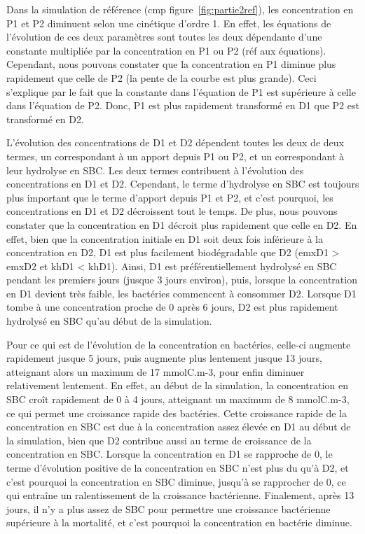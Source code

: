 \par{
Dans la simulation de référence (cmp figure~\ref{fig:partie2ref}),
les concentration en P1 et P2 diminuent selon une cin\'etique d'ordre 1. En effet, les \'equations de l'\'evolution de ces deux param\`etres sont toutes les deux d\'ependante d'une constante multipli\'ee par la concentration en P1 ou P2 (r\'ef aux \'equations). Cependant, nous pouvons constater que la concentration en P1 diminue plus rapidement que celle de P2 (la pente de la courbe est plus grande). Ceci s'explique par le fait que la constante dans l'\'equation de P1 est sup\'erieure \`a celle dans l'\'equation de P2. Donc, P1 est plus rapidement transform\'e en D1 que P2 est transform\'e en D2.
}
\par{
L'\'evolution des concentrations de D1 et D2 d\'ependent toutes les deux de deux termes, un correspondant \`a un apport depuis P1 ou P2, et un correspondant \`a leur hydrolyse en SBC. Les deux termes contribuent \`a l'\'evolution des concentrations en D1 et D2. Cependant, le terme d'hydrolyse en SBC est toujours plus important que le terme d'apport depuis P1 et P2, et c'est pourquoi, les concentrations en D1 et D2 d\'ecroissent tout le temps. De plus, nous pouvons constater que la concentration en D1 d\'ecroit plus rapidement que celle en D2. En effet, bien que la concentration initiale en D1 soit deux fois inf\'erieure \`a la concentration en D2, D1 est plus facilement biod\'egradable que D2 (emxD1 > emxD2 et khD1 < khD1). Ainsi, D1 est pr\'ef\'erentiellement hydrolys\'e en SBC pendant les premiers jours (jusque 3 jours environ), puis, lorsque la concentration en D1 devient tr\`es faible, les bact\'eries commencent \`a consommer D2. Lorsque D1 tombe \`a une concentration proche de 0 apr\`es 6 jours, D2 est plus rapidement hydrolys\'e en SBC qu'au d\'ebut de la simulation.
}
\par{
Pour ce qui est de l'\'evolution de la concentration en bact\'eries, celle-ci augmente rapidement jusque 5 jours, puis augmente plus lentement jusque 13 jours, atteignant alors un maximum de 17 mmolC.m-3, pour enfin diminuer relativement lentement. En effet, au d\'ebut de la simulation, la concentration en SBC cro\^it rapidement de 0 \`a 4 jours, atteignant un maximum de 8 mmolC.m-3, ce qui permet une croissance rapide des bact\'eries. Cette croissance rapide de la concentration en SBC est due \`a la concentration assez \'elev\'ee en D1 au d\'ebut de la simulation, bien que D2 contribue aussi au terme de croissance de la concentration en SBC. Lorsque la concentration en D1 se rapproche de 0, le terme d'\'evolution positive de la concentration en SBC n'est plus du qu'\`a D2, et c'est pourquoi la concentration en SBC diminue, jusqu'\`a se rapprocher de 0, ce qui entra\^ine un ralentissement de la croissance bact\'erienne. Finalement, apr\`es 13 jours, il n'y a plus assez de SBC pour permettre une croissance bact\'erienne sup\'erieure \`a la mortalit\'e, et c'est pourquoi la concentration en bact\'erie diminue.
}
